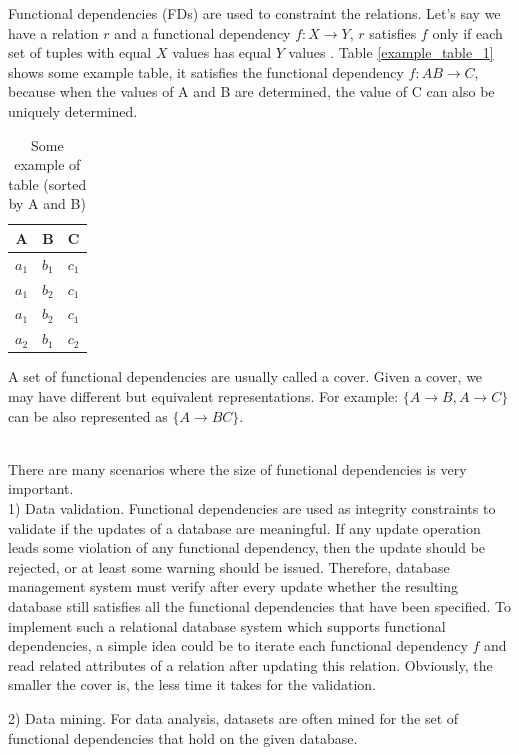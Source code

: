 \documentclass[11pt]{book}
\begin{document}
Functional dependencies (FDs) are used to constraint the relations. Let's say we have a relation $r$ and a functional dependency $f: X \rightarrow Y$, $r$ satisfies $f$ only if each set of tuples with equal $X$ values has equal $Y$ values \cite{maier1983theory}. Table \ref{example_table_1} shows some example table, it satisfies the functional dependency $f: AB \to C$, because when the values of A and B are determined, the value of C can also be uniquely determined.

\begin{table}[H]
	\centering
	
	\begin{tabular}{ c c c }
		A     & B     & C \\
		\hline
		$a_1$ & $b_1$ & $c_1$ \\
		\hdashline
		$a_1$ & $b_2$ & $c_1$ \\ 
		$a_1$ & $b_2$ & $c_1$ \\
		\hdashline		
		$a_2$ & $b_1$ & $c_2$ \\
	\end{tabular}
	
	\caption{Some example of table (sorted by A and B)}
\end{table}

A set of functional dependencies are usually called a cover. Given a cover, we may have different but equivalent representations. For example: $\{ A \to B, A \to C \}$ can be also represented as $\{ A \to BC \}$.

~\\
There are many scenarios where the size of functional dependencies is very important.
~\\

1) Data validation. Functional dependencies are used as integrity constraints to validate if the updates of a database are meaningful. If any update operation leads some violation of any functional dependency, then the update should be rejected, or at least some warning should be issued. Therefore, database management system must verify after every update whether the resulting database still satisfies all the functional dependencies that have been specified. To implement such a relational database system which supports functional dependencies, a simple idea could be to iterate each functional dependency $f$ and read related attributes of a relation after updating this relation. Obviously, the smaller the cover is, the less time it takes for the validation.

2) Data mining. For data analysis, datasets are often mined for the set of functional dependencies that hold on the given database.
\end{document}
